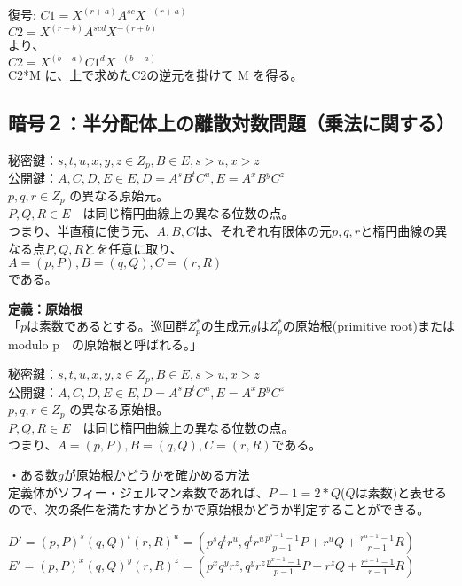 \documentclass[
]{article}
\begin{document}
復号: \(C1 = X^{(r+a)} A^{sc} X^{-(r+a)}\)\\
\(C2 = X^{(r+b)} A^{scd} X^{-(r+b)}\)\\
より、\\
\(C2 = X^{(b-a)} C1^d X^{-(b-a)}\)\\
C2*M に、上で求めたC2の逆元を掛けて M を得る。

\hypertarget{ux6697ux53f7uxff12ux534aux5206ux914dux4f53ux4e0aux306eux96e2ux6563ux5bfeux6570ux554fux984cux4e57ux6cd5ux306bux95a2ux3059ux308b}{%
\subsection{暗号２：半分配体上の離散対数問題（乗法に関する）}\label{ux6697ux53f7uxff12ux534aux5206ux914dux4f53ux4e0aux306eux96e2ux6563ux5bfeux6570ux554fux984cux4e57ux6cd5ux306bux95a2ux3059ux308b}}

秘密鍵：\(s,t,u,x,y,z \in Z_p,B \in E,s > u, x > z\)\\
公開鍵：\(A,C,D,E \in E,D=A^sB^tC^u,E=A^xB^yC^z\)\\
\(p,q,r \in Z_p\) の異なる原始元。\\
\(P,Q,R \in E\)　は同じ楕円曲線上の異なる位数の点。\\
つまり、半直積に使う元、\(A,B,C\)は、それぞれ有限体の元\(p,q,r\)と楕円曲線の異なる点\(P,Q,R\)とを任意に取り、\\
\(A=(p,P),B=(q,Q),C=(r,R)\)\\
である。

\textbf{定義：原始根}\\
「\(p\)は素数であるとする。巡回群\(Z^*_p\)の生成元\(g\)は\(Z^*_p\)の原始根(primitive
root)またはmodulo p　の原始根と呼ばれる。」

秘密鍵：\(s,t,u,x,y,z \in Z_p,B \in E,s > u, x > z\)\\
公開鍵：\(A,C,D,E \in E,D=A^sB^tC^u,E=A^xB^yC^z\)\\
\(p,q,r \in Z_p\) の異なる原始根。\\
\(P,Q,R \in E\)　は同じ楕円曲線上の異なる位数の点。\\
つまり、\(A=(p,P),B=(q,Q),C=(r,R)\)である。

・ある数\(g\)が原始根かどうかを確かめる方法\\
定義体がソフィー・ジェルマン素数であれば、\(P-1=2*Q\)(\(Q\)は素数)と表せるので、次の条件を満たすかどうかで原始根かどうか判定することができる。

\(D'=(p,P)^s(q,Q)^t(r,R)^u=(p^sq^tr^u,q^tr^u\frac{p^{s-1}-1}{p-1}P+r^uQ+\frac{r^{u-1}-1}{r-1}R)\)\\
\(E'=(p,P)^x(q,Q)^y(r,R)^z=(p^xq^yr^z,q^yr^z\frac{p^{x-1}-1}{p-1}P+r^zQ+\frac{r^{z-1}-1}{r-1}R)\)
\end{document}

